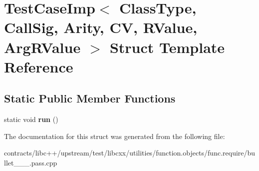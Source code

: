 \hypertarget{struct_test_case_imp}{}\section{Test\+Case\+Imp$<$ Class\+Type, Call\+Sig, Arity, CV, R\+Value, Arg\+R\+Value $>$ Struct Template Reference}
\label{struct_test_case_imp}
\subsection*{Static Public Member Functions}
\begin{DoxyCompactItemize}
\item 
\mbox{\label{struct_test_case_imp_a75ece7060d73c324f838334a45d8b4a1}} 
static void {\bfseries run} ()
\end{DoxyCompactItemize}


The documentation for this struct was generated from the following file\+:\begin{DoxyCompactItemize}
\item 
contracts/libc++/upstream/test/libcxx/utilities/function.\+objects/func.\+require/bullet\+\_\+\_\+\_.\+pass.\+cpp\end{DoxyCompactItemize}
